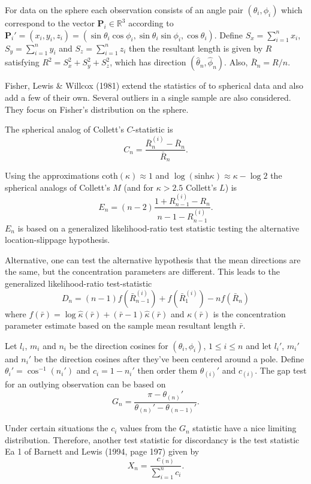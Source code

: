 \documentclass{article}\usepackage[]{graphicx}\usepackage[]{color}
\newcommand{\R}{{\mathbb{R}}}
\begin{document}
For data on the sphere each observation consists of an angle pair $(\theta_i,\phi_i)$ which correspond to the vector $\bm P_i\in \R^3$ according to $\bm P_i'=(x_i,y_i,z_i)=(\sin\theta_i\cos\phi_i,\sin\theta_i\sin\phi_i,\cos\theta_i)$.  Define $S_x=\sum_{i=1}^nx_i$, $S_y=\sum_{i=1}^ny_i$ and $S_z=\sum_{i=1}^nz_i$ then the resultant length is given by $R$ satisfying $R^2=S_x^2+S_y^2+S_z^2$, which has direction $(\hat\theta_n,\hat\phi_n)$.  Also, $\bar{R}_n=R/n$.


Fisher, Lewis \& Willcox (1981) \cite{fisher1981} extend the statistics of \cite{collett1980} to spherical data and also add a few of their own.  Several outliers in a single sample are also considered.  They focus on Fisher's distribution on the sphere.

The spherical analog of Collett's $C$-statistic is
\[
C_n=\frac{\bar{R}_n^{(i)}-\bar{R}_n}{\bar{R}_n}.
\]

Using the approximations coth$(\kappa)\approx 1$ and $\log(\text{sinh}\kappa)\approx\kappa-\log 2$ the spherical analogs of Collett's $M$ (and for $\kappa>2.5$ Collett's $L$) is 
\[
E_n=(n-2)\frac{1+R_{n-1}^{(i)}-R_n}{n-1-R_{n-1}^{(i)}}.
\]
$E_n$ is based on a generalized likelihood-ratio test statistic testing the alternative location-slippage hypothesis.

Alternative, one can test the alternative hypothesis that the mean directions are the same, but the concentration parameters are different.  This leads to the generalized likelihood-ratio test-statistic
\[
D_n=(n-1)f(\bar{R}_{n-1}^{(i)})+f(\bar{R}_1^{(i)})-nf(\bar{R}_n)
\]
where $f(\bar{r})=\log\hat\kappa(\bar{r})+(\bar{r}-1)\hat\kappa(\bar{r})$ and $\kappa(\bar{r})$ is the concentration parameter estimate based on the sample mean resultant length $\bar{r}$.

Let $l_i$, $m_i$ and $n_i$ be the direction cosines for $(\theta_i,\phi_i)$, $1\leq i\leq n$ and let $l_i'$, $m_i'$ and $n_i'$ be the direction cosines after they've been centered around a pole.  Define $\theta_i'=\cos^{-1}(n_i')$ and $c_i=1-n_i'$ then order them $\theta_{(i)}'$ and $c_{(i)}$.  The gap test for an outlying observation can be based on
\[
G_n=\frac{\pi-\theta_{(n)}'}{\theta_{(n)}'-\theta_{(n-1)}'}.
\]

Under certain situations the $c_i$ values from the $G_n$ statistic have a nice limiting distribution.  Therefore, another test statistic for discordancy is the test statistic Ea 1 of Barnett and Lewis (1994, page 197) \cite{barnett1994} given by
\[
X_n=\frac{c_{(n)}}{\sum_{i=1}^nc_i}.
\]
\end{document}
